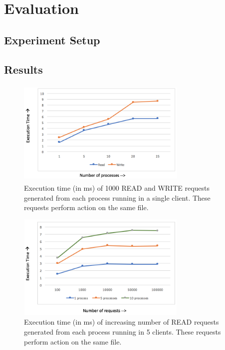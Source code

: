 \section{Evaluation}

\subsection{Experiment Setup}


\subsection{Results}

\begin{figure}
\centering
\includegraphics[height=2in, width=3.2in]{images/OneClient.png}
\caption{Execution time (in ms) of 1000 READ and WRITE requests generated from each process running in a single client. These requests perform action on the same file.}
\end{figure}

\begin{figure}
\centering
\includegraphics[height=2in, width=3.2in]{images/FiveClient_Read.png}
\caption{Execution time (in ms) of increasing number of READ requests generated from each process running in 5 clients. These requests perform action on the same file.}
\end{figure}

